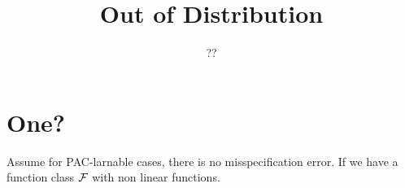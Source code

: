 \documentclass[11pt,fullpage]{article}
\begin{document}
\title{Out of Distribution}
\author{??}
\maketitle

\section{One?}

Assume for PAC-larnable cases, there is no misspecification error. If we have a function class ${\mathcal{F}}$ with non linear functions.



\end{document}
